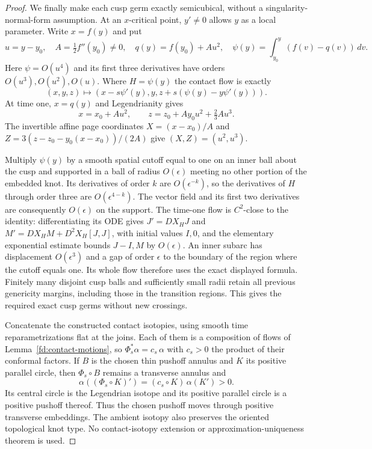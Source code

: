 \begin{proof}
We finally make each cusp germ exactly semicubical, without a
singularity-normal-form assumption. At an $x$-critical point,
$y'\ne0$ allows $y$ as a local parameter. Write $x=f(y)$ and put
\begin{equation}
 u=y-y_0,\quad A=\tfrac12 f''(y_0)\ne0,\quad
 q(y)=f(y_0)+Au^2,\quad
 \psi(y)=\int_{y_0}^y(f(v)-q(v))\,dv.
\end{equation}
Here $\psi=O(u^4)$ and its first three derivatives have orders
$O(u^3),O(u^2),O(u)$. Where $H=\psi(y)$ the contact flow is exactly
\begin{equation}
 (x,y,z)\longmapsto
 (x-s\psi'(y),y,z+s(\psi(y)-y\psi'(y))).
\end{equation}
At time one, $x=q(y)$ and Legendrianity gives
\begin{equation}
 x=x_0+Au^2,\qquad z=z_0+Ay_0u^2+\tfrac23Au^3.
\end{equation}
The invertible affine page coordinates
$X=(x-x_0)/A$ and $Z=3(z-z_0-y_0(x-x_0))/(2A)$ give $(X,Z)=(u^2,u^3)$.

Multiply $\psi(y)$ by a smooth spatial cutoff equal to one on an inner
ball about the cusp and supported in a ball of radius $O(\epsilon)$
meeting no other portion of the embedded knot. Its derivatives of
order $k$ are $O(\epsilon^{-k})$, so the derivatives of $H$ through
order three are $O(\epsilon^{4-k})$. The vector field and its first
two derivatives are consequently $O(\epsilon)$ on the support.
The time-one flow is $C^2$-close to the identity: differentiating its
ODE gives $J'=DX_H J$ and
$M'=DX_H M+D^2X_H[J,J]$, with initial values $I,0$, and the elementary
exponential estimate bounds $J-I,M$ by $O(\epsilon)$.
An inner subarc has displacement $O(\epsilon^3)$ and a gap of order
$\epsilon$ to the boundary of the region where the cutoff equals one.
Its whole flow therefore uses the exact displayed formula.
Finitely many disjoint cusp balls and sufficiently small radii retain
all previous genericity margins, including those in the transition
regions. This gives the required exact cusp germs without new crossings.

Concatenate the constructed contact isotopies, using smooth time
reparametrizations flat at the joins. Each of them is a composition of
flows of Lemma~\ref{fd:contact-motions}, so $\Phi_s^*\alpha=c_s\,\alpha$ with
$c_s>0$ the product of their conformal factors. If $B$ is the chosen thin
pushoff annulus and $K$ its positive parallel circle, then
$\Phi_s\circ B$ remains a transverse annulus and
\begin{equation}
 \alpha((\Phi_s\circ K)')=(c_s\circ K)\,\alpha(K')>0.
\end{equation}
Its central circle is the Legendrian isotope and its positive parallel
circle is a positive pushoff thereof. Thus the chosen pushoff moves
through positive transverse embeddings. The ambient isotopy also
preserves the oriented topological knot type. No contact-isotopy
extension or approximation-uniqueness theorem is used.
\end{proof}

